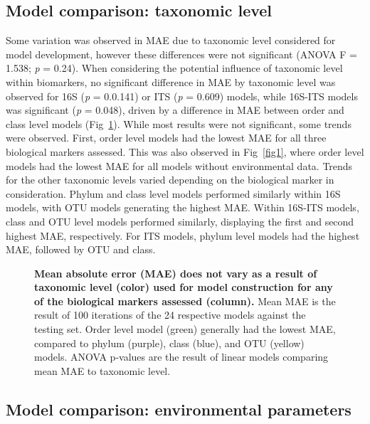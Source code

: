 \documentclass[
  10pt,
  letterpaper,
]{article}
\begin{document}
\hypertarget{model-comparison-taxonomic-level}{%
\subsection{Model comparison: taxonomic
level}\label{model-comparison-taxonomic-level}}

Some variation was observed in MAE due to taxonomic level considered for
model development, however these differences were not significant (ANOVA
F = 1.538; \emph{p} = 0.24). When considering the potential influence of
taxonomic level within biomarkers, no significant difference in MAE by
taxonomic level was observed for 16S (\emph{p} = 0.0.141) or ITS
(\emph{p} = 0.609) models, while 16S-ITS models was significant
(\emph{p} = 0.048), driven by a difference in MAE between order and
class level models (Fig~\ref{fig4}). While most results were not
significant, some trends were observed. First, order level models had
the lowest MAE for all three biological markers assessed. This was also
observed in Fig~\ref{fig1}, where order level models had the lowest MAE
for all models without environmental data. Trends for the other
taxonomic levels varied depending on the biological marker in
consideration. Phylum and class level models performed similarly within
16S models, with OTU models generating the highest MAE. Within 16S-ITS
models, class and OTU level models performed similarly, displaying the
first and second highest MAE, respectively. For ITS models, phylum level
models had the highest MAE, followed by OTU and class.

\begin{figure}[!h]
\caption{{\bf Mean absolute error (MAE) does not vary as a result of taxonomic level (color) used for model construction for any of the biological markers assessed (column).}
Mean MAE is the result of 100 iterations of the 24 respective models against the testing set. Order level model (green) generally had the lowest MAE, compared to phylum (purple), class (blue), and OTU (yellow) models. ANOVA p-values are the result of linear models comparing mean MAE to taxonomic level.}
\label{fig4}
\end{figure}

\hypertarget{model-comparison-environmental-parameters}{%
\subsection{Model comparison: environmental
parameters}\label{model-comparison-environmental-parameters}}
\end{document}
